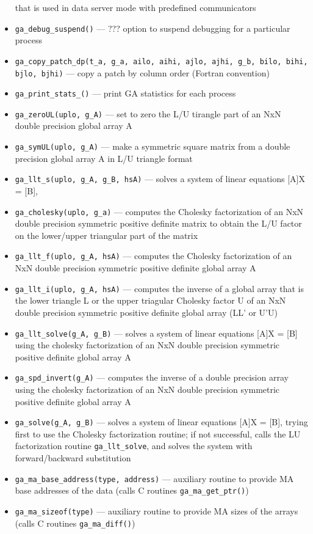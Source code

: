 \begin{itemize}
that is used in data server mode with predefined communicators
\item {\tt ga\_debug\_suspend()} --- ??? option to suspend debugging for a particular process
\item {\tt ga\_copy\_patch\_dp(t\_a, g\_a, ailo, aihi, ajlo, ajhi,
                   g\_b, bilo, bihi, bjlo, bjhi)} --- copy a patch by column order (Fortran convention)
\item {\tt ga\_print\_stats\_()} --- print GA statistics for each process
\item {\tt ga\_zeroUL(uplo, g\_A)} --- set to zero the L/U tirangle part of an NxN
double precision global array A
\item {\tt ga\_symUL(uplo, g\_A)} --- make a symmetric square matrix from a
double precision global array A in L/U triangle format
\item {\tt ga\_llt\_s(uplo, g\_A, g\_B, hsA)} --- solves a system of linear equations [A]X = [B],
\item {\tt ga\_cholesky(uplo, g\_a)} --- computes the Cholesky factorization of an NxN
double precision symmetric positive definite matrix to obtain the L/U factor
on the lower/upper triangular part of the matrix
\item {\tt ga\_llt\_f(uplo, g\_A, hsA)} --- computes the Cholesky factorization of an NxN 
double precision symmetric positive definite global array A
\item {\tt ga\_llt\_i(uplo, g\_A, hsA)} --- computes the inverse of a global array that is
the lower triangle L or the upper triagular Cholesky factor U of an NxN 
double precision symmetric positive definite global array (LL' or U'U)
\item {\tt ga\_llt\_solve(g\_A, g\_B)} --- solves a system of linear equations [A]X = [B]
using the cholesky factorization of an NxN
double precision symmetric positive definite global array A
\item {\tt ga\_spd\_invert(g\_A)} --- computes the inverse of a double precision array
using the cholesky factorization of an NxN
double precision symmetric positive definite global array A
\item {\tt ga\_solve(g\_A, g\_B)} --- solves a system of linear equations [A]X = [B], trying
first to use
the Cholesky factorization routine; if not successful, calls the LU
factorization routine \verb+ga_llt_solve+, and solves the system with forward/backward
substitution
\item {\tt ga\_ma\_base\_address(type, address)} --- auxiliary routine to provide MA
base addresses of the data  (calls C routines {\tt ga\_ma\_get\_ptr()})
\item {\tt ga\_ma\_sizeof(type)} --- auxiliary routine to provide MA
sizes of the arrays (calls C routines {\tt ga\_ma\_diff()})

\end{itemize}

